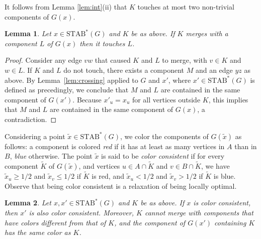 \documentclass{article} \usepackage{fullpage}
\newtheorem{lemma}{Lemma}
\newcommand{\STAB}{\mathrm{STAB}}
\begin{document}
It follows from Lemma \ref{lem:int}(ii) that $K$ touches at most two non-trivial components of $G(x)$. 

\begin{lemma}
\label{lem:rebalancing_touch}
Let $x \in \STAB^*(G)$ and $K$ be as above. If $K$ merges with a component $L$ of $G(x)$ then it touches $L$.
\end{lemma}

\begin{proof}
Consider any edge $vw$ that caused $K$ and $L$ to merge, with $v \in K$ and $w \in L$. If $K$ and $L$ do not touch, there exists a component $M$ and an edge $yz$ as above. By Lemma~\ref{lem:crossing} applied to $G$ and $x'$, where $x' \in \STAB^*(G)$ is defined as precedingly, we conclude that $M$ and $L$ are contained in the same component of $G(x')$. Because $x'_u = x_u$ for all vertices outside $K$, this implies that $M$ and $L$ are contained in the same component of $G(x)$, a contradiction.
\end{proof}

Considering a point $\tilde x \in \STAB^*(G)$, we color the components of $G(\tilde x)$ as follows: a component is colored {\sl red} if it has at least as many vertices in $A$ than in $B$, {\sl blue} otherwise. The point $\tilde x$ is said to be {\sl color consistent}
if for every component $\tilde K$ of $G(\tilde x)$, and vertices $u \in A \cap \tilde K$ and $v \in B \cap \tilde K$, we have $\tilde x_{u} \geq 1/2$ and $ \tilde x_{v} \leq 1/2$ if $\tilde K$ is red, and $\tilde x_{u} < 1/2$ and $\tilde x_{v} > 1/2$ if $\tilde K$ is blue. Observe that being color consistent is a relaxation of being locally optimal. 

\begin{lemma}
\label{lem:rebalancing_colors}
Let $x, x' \in \STAB^*(G)$ and $K$ be as above.
If $x$ is color consistent, then $x'$ is also color consistent. Moreover, $K$ cannot merge with components that have colors different from that of $K$, and the component of $G(x')$ containing $K$ has the same color as $K$.
\end{lemma}
\end{document}
